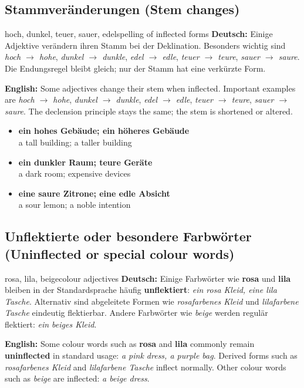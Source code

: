 \documentclass[a4paper,11pt]{article}
\newcommand{\GermanText}[1]{\textbf{Deutsch: }#1\par}
\newcommand{\EnglishText}[1]{{\small\color{SoftGray}\textbf{English: }#1\par}}
\newcommand{\ExampleItem}[2]{\item \textbf{#1}\\{\small\color{SoftGray}#2}}
\begin{document}
\subsection{Stammveränderungen \textnormal{(Stem changes)}}
\begin{grammarentry}{hoch, dunkel, teuer, sauer, edel}{spelling of inflected forms}
\GermanText{Einige Adjektive verändern ihren Stamm bei der Deklination. Besonders wichtig sind \emph{hoch $\rightarrow$ hohe}, \emph{dunkel $\rightarrow$ dunkle}, \emph{edel $\rightarrow$ edle}, \emph{teuer $\rightarrow$ teure}, \emph{sauer $\rightarrow$ saure}. Die Endungsregel bleibt gleich; nur der Stamm hat eine verkürzte Form.}
\EnglishText{Some adjectives change their stem when inflected. Important examples are \emph{hoch $\rightarrow$ hohe}, \emph{dunkel $\rightarrow$ dunkle}, \emph{edel $\rightarrow$ edle}, \emph{teuer $\rightarrow$ teure}, \emph{sauer $\rightarrow$ saure}. The declension principle stays the same; the stem is shortened or altered.}
\end{grammarentry}
\begin{exbox}\begin{itemize}
\ExampleItem{ein hohes Gebäude; ein höheres Gebäude}{a tall building; a taller building}
\ExampleItem{ein dunkler Raum; teure Geräte}{a dark room; expensive devices}
\ExampleItem{eine saure Zitrone; eine edle Absicht}{a sour lemon; a noble intention}
\end{itemize}\end{exbox}

\subsection{Unflektierte oder besondere Farbwörter \textnormal{(Uninflected or special colour words)}}
\begin{grammarentry}{rosa, lila, beige}{colour adjectives}
\GermanText{Einige Farbwörter wie \textbf{rosa} und \textbf{lila} bleiben in der Standardsprache häufig \textbf{unflektiert}: \emph{ein rosa Kleid, eine lila Tasche}. Alternativ sind abgeleitete Formen wie \emph{rosafarbenes Kleid} und \emph{lilafarbene Tasche} eindeutig flektierbar. Andere Farbwörter wie \emph{beige} werden regulär flektiert: \emph{ein beiges Kleid}.}
\EnglishText{Some colour words such as \textbf{rosa} and \textbf{lila} commonly remain \textbf{uninflected} in standard usage: \emph{a pink dress, a purple bag}. Derived forms such as \emph{rosafarbenes Kleid} and \emph{lilafarbene Tasche} inflect normally. Other colour words such as \emph{beige} are inflected: \emph{a beige dress}.}
\end{grammarentry}
\end{document}
